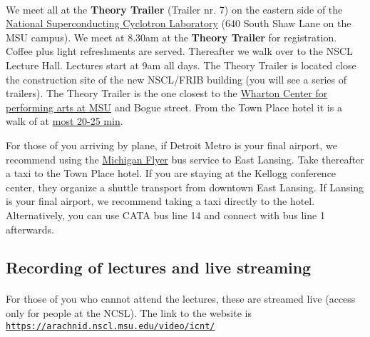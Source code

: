 \documentclass[%
twoside,                 %
final,                   %
10pt]{article}
\begin{document}
\paragraph{}
We meet all at the \textbf{Theory Trailer} (Trailer nr. 7) on the eastern side of the \href{{http://www.nscl.msu.edu/}}{National Superconducting Cyclotron
Laboratory} (640 South Shaw Lane on the MSU campus).  
We meet at 8.30am at the \textbf{Theory Trailer} for registration. Coffee plus light refreshments are served. Thereafter we walk over to the NSCL Lecture Hall. Lectures start at 9am all days.
The Theory Trailer is located close the construction site of the new NSCL/FRIB building (you will see a series of trailers). The Theory Trailer is the one closest to the \href{{http://www.whartoncenter.com}}{Wharton Center for performing arts at MSU} and Bogue street. 
From the Town Place hotel it is a walk of at \href{{https://www.google.com/maps/dir/2855+Hannah+Blvd,+East+Lansing,+MI+48823/640+South+Shaw+Lane,+East+Lansing,+MI/@42.7219308,-84.4747951,15z/data=!3m1!4b1!4m14!4m13!1m5!1m1!1s0x8822c2bce3547475:0xd5a97d9b6a59e537!2m2!1d-84.456337!2d42.718323!1m5!1m1!1s0x8822c2841754be71:0xb0ff5dca5dac1c71!2m2!1d-84.4738287!2d42.7247813!3e2}}{most 20-25 min}.

For those of you arriving by plane, if Detroit Metro is your final airport, we recommend using the \href{{http://www.michiganflyer.com}}{Michigan Flyer} bus service to East Lansing. Take thereafter a taxi to the Town Place hotel. If you are staying at the Kellogg conference center, they organize a shuttle transport from downtown East Lansing. If Lansing is your final airport, we recommend taking a taxi directly to the hotel. Alternatively, you can use CATA bus line 14 and connect with bus line 1 afterwards.



\subsection{Recording of lectures and live streaming}

\paragraph{}
For those of you who cannot attend the lectures, these are streamed live (access only for people at the NCSL). The link to the website is \href{{https://arachnid.nscl.msu.edu/video/icnt/}}{\nolinkurl{https://arachnid.nscl.msu.edu/video/icnt/}}
\end{document}
